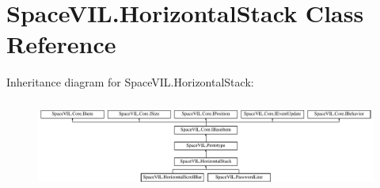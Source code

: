 \hypertarget{class_space_v_i_l_1_1_horizontal_stack}{}\section{Space\+V\+I\+L.\+Horizontal\+Stack Class Reference}
\label{class_space_v_i_l_1_1_horizontal_stack}
Inheritance diagram for Space\+V\+I\+L.\+Horizontal\+Stack\+:\begin{figure}[H]
\begin{center}
\leavevmode
\includegraphics[height=2.962963cm]{class_space_v_i_l_1_1_horizontal_stack}
\end{center}
\end{figure}
